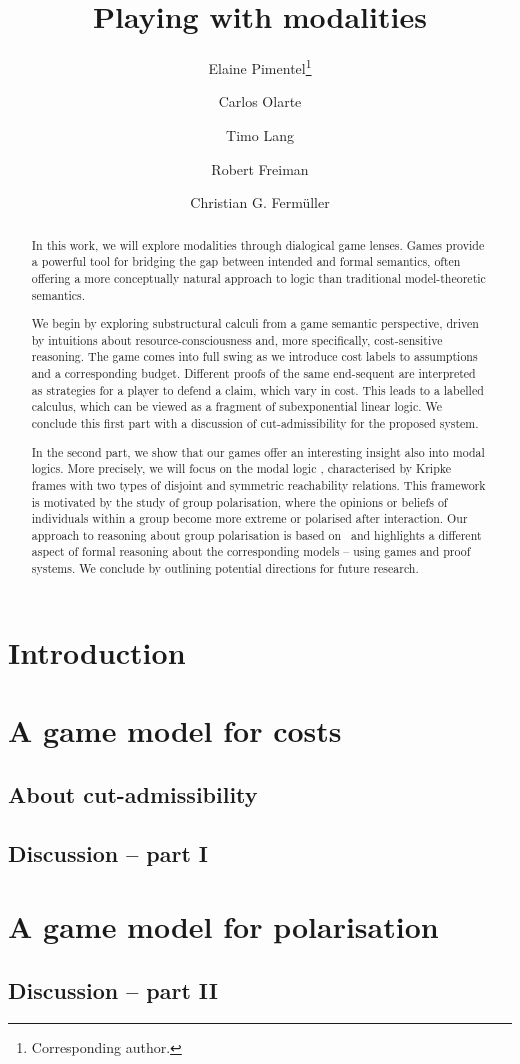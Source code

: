 \documentclass[a4paper,UKenglish,cleveref, autoref, thm-restate]{lipics-v2021}
\title{Playing with modalities}
\author{Elaine Pimentel\footnote{Corresponding author.}}{Computer Science Department UCL, UK \and \url{https://sites.google.com/site/elainepimentel/} }{e.pimentel@ucl.ac.uk}{https://orcid.org/0000-0002-7113-0801}{Pimentel has received funding from the European Union's Horizon 2020 research and innovation programme under the Marie Sk\l odowska-Curie grant agreement Number 101007627 and by the Leverhulme Project ECUMENICAL.}
\author{Carlos Olarte}{LIPN, CNRS UMR 7030, Universit\'{e} Sorbonne Paris Nord, France \and \url{https://sites.google.com/site/carlosolarte/} }{olarte@lipn.univ-paris13.fr}{https://orcid.org/0000-0002-7264-7773}{The work of Olarte has been partially supported by the SGR project PROMUEVA (BPIN
2021000100160) under the supervision of Minciencias (Ministerio de Ciencia Tecnolog\'ia e Innovaci\'on, Colombia). Olarte acknowledges also support from the NATO
Science for Peace
and Security Programme through grant number G6133 (project SymSafe). }
\author{Timo Lang}{Computer Science Department UCL, UK \and \url{https://www.timolang.com/}}{timo.lang@ucl.ac.uk}{0000-0002-8257-968X}{}
\author{Robert Freiman}{TU-Wien, Austria}{robert@logic.at}{0000-0001-8251-4272}{}
\author{Christian G. Ferm\"{u}ller}{TU-Wien, Austria \and \url{https://www.logic.at/staff/chrisf/home.html}}{chrisf@logic.at}{0000-0003-2932-5477}{}
\begin{document}
\maketitle

\begin{abstract}
In this work, we will explore modalities through dialogical game lenses. Games provide a powerful tool for bridging the gap between intended and formal semantics, often offering a more conceptually natural approach to logic than traditional model-theoretic semantics.

We begin by exploring substructural calculi  from a game semantic perspective, driven by intuitions about resource-consciousness and, more specifically, cost-sensitive reasoning. The game comes into full swing as we introduce cost labels to assumptions and a corresponding budget. Different proofs of the same end-sequent are interpreted as strategies for a player to defend a claim, which vary in cost. This leads to a labelled calculus, which can be viewed as a fragment of subexponential linear logic. 
%
We conclude this first part with a discussion of cut-admissibility for the proposed system. 

In the second part, we show that our games offer an interesting insight also into modal logics. More precisely, we will focus on the modal logic \PNL, characterised by Kripke frames with two types of disjoint and symmetric reachability relations. This framework is motivated by the study of group polarisation, where the opinions or beliefs of individuals within a group become more extreme or polarised after interaction. Our approach to reasoning about group polarisation is based on \PNL\ and highlights a different aspect of formal reasoning about the corresponding models -- using games and proof systems.
%
We conclude by outlining potential directions for future research.

\end{abstract}

\section{Introduction}\label{sec:intro}


\section{A game model for costs}\label{sec:sell}

\subsection{About cut-admissibility}\label{subsec:cut}

\subsection{Discussion -- part I}\label{subsec:conc1}

\section{A game model for polarisation}

\subsection{Discussion -- part II}\label{subsec:conc2}


\end{document}
